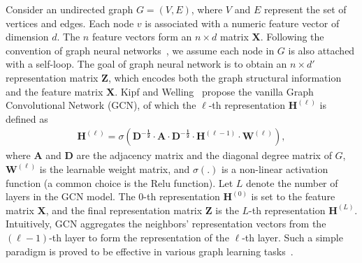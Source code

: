  

Consider an undirected graph $G=(V,E)$, where $V$ and $E$ represent the set of vertices and edges. Each node $v$ is associated with a numeric feature vector of dimension $d$. The $n$ feature vectors form an $n \times d$ matrix $\mathbf{X}$. Following the convention of graph neural networks~\cite{kipf2016GCN,hamilton2017graphSAGE}, we assume each node in $G$ is also attached with a self-loop.  The goal of graph neural network is to obtain an $n\times d'$ representation matrix $\mathbf{Z}$, which encodes both the graph structural information and the feature matrix $\mathbf{X}$.
Kipf and Welling~\cite{kipf2016GCN} propose the vanilla Graph Convolutional Network (GCN), of which the $\ell$-th representation $\mathbf{H}^{(\ell)}$ is defined as%
\begin{equation}
\begin{aligned}\label{eqn:definition_GCN}
	\mathbf{H}^{(\ell)}=\sigma\left(\mathbf{{D}^{-\frac{1}{2}}} \cdot \mathbf{{A}} \cdot \mathbf{{D}^{-\frac{1}{2}}} \cdot \mathbf{H}^{(\ell-1)} \cdot \mathbf{W}^{(\ell)}\right),
\end{aligned}	
\end{equation}
where $\mathbf{A}$ and $\mathbf{D}$ are the adjacency matrix and the diagonal degree matrix of $G$, $\mathbf{W}^{(\ell)}$ is the learnable weight matrix, and $\sigma(.)$ is a non-linear activation function (a common choice is the Relu function). Let $L$ denote the number of layers in the GCN model. The $0$-th representation $\mathbf{H}^{(0)}$ is set to the feature matrix $\mathbf{X}$, and the final representation matrix $\mathbf{Z}$ is the $L$-th representation $\mathbf{H}^{(L)}$. Intuitively, GCN aggregates the neighbors' representation vectors from the $(\ell-1)$-th layer to form the representation of the $\ell $-th layer. Such a simple paradigm is proved to be effective in various graph learning tasks~\cite{kipf2016GCN,hamilton2017graphSAGE}. 






